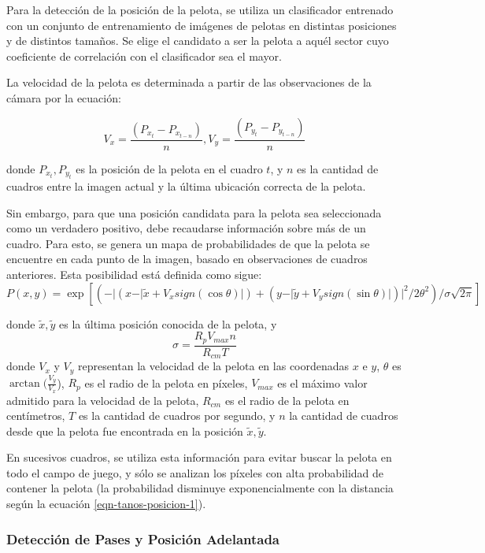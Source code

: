 Para la detección de la posición de la pelota, se utiliza un clasificador
entrenado con un conjunto de entrenamiento de imágenes de pelotas en distintas
posiciones y de distintos tamaños. Se elige el candidato a ser la pelota a
aquél sector cuyo coeficiente de correlación con el clasificador sea el mayor.

La velocidad de la pelota es determinada a partir de las observaciones de la
cámara por la ecuación:

\[
  V_x = \frac{(P_{x_t} - P_{x_{t-n}})}{n}, V_y = \frac{(P_{y_t} - P_{y_{t-n}})}{n}
\]

donde $P_{x_t}, P_{y_t}$ es la posición de la pelota en el cuadro $t$, y $n$ es
la cantidad de cuadros entre la imagen actual y la última ubicación correcta de
la pelota.

Sin embargo, para que una posición candidata para la pelota sea seleccionada
como un verdadero positivo, debe recaudarse información sobre más de un cuadro.
Para esto, se genera un mapa de probabilidades de que la pelota se encuentre en
cada punto de la imagen, basado en observaciones de cuadros anteriores. Esta
posibilidad está definida como sigue:
\begin{equation}
  \label{eqn-tanos-posicion-1}
  P(x, y) = \exp \left[ (- \vert ( x - \vert \tilde{x} + V_x sign(\cos \theta) \vert )
  + ( y - \vert \tilde{y} + V_y sign(\sin \theta) \vert)\vert ^ 2 / 2\theta^2) /\sigma \sqrt{2\pi} \right]
\end{equation}

donde $\tilde{x},\tilde{y}$ es la última posición conocida de la pelota, y
\[
  \sigma = \frac{R_p V_{max} n}{R_{cm}T}
\]
donde $V_x$ y $V_y$ representan la velocidad de la pelota en las coordenadas
$x$ e $y$, $\theta$ es $\arctan(\tfrac{V_y}{V_x}$), $R_p$ es el radio de la pelota
en píxeles, $V_{max}$ es el máximo valor admitido para la velocidad de la
pelota, $R_{cm}$ es el radio de la pelota en centímetros, $T$ es la cantidad de
cuadros por segundo, y $n$ la cantidad de cuadros desde que la pelota fue
encontrada en la posición $\tilde{x},\tilde{y}$.

En sucesivos cuadros, se utiliza esta información para evitar buscar la pelota
en todo el campo de juego, y sólo se analizan los píxeles con alta probabilidad
de contener la pelota (la probabilidad disminuye exponencialmente con la
distancia según la ecuación \ref{eqn-tanos-posicion-1}).

\subsubsection{Detección de Pases y Posición Adelantada}

